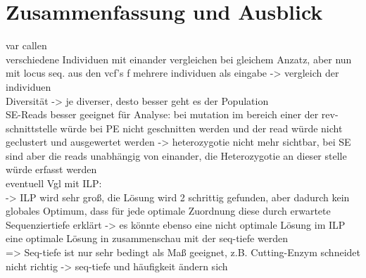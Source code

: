 \chapter{Zusammenfassung und Ausblick} \label{sec:ausblick}
var callen\\
verschiedene Individuen mit einander vergleichen bei gleichem Anzatz, aber nun mit locus seq. aus den vcf's f mehrere individuen als eingabe -> vergleich der individuen \\
Diversität -> je diverser, desto besser geht es der Population\\
SE-Reads besser geeignet für Analyse: bei mutation im bereich einer der rev-schnittstelle  würde bei PE nicht geschnitten werden und der read würde nicht geclustert und ausgewertet werden -> heterozygotie nicht mehr sichtbar, bei SE sind aber die reads unabhängig von einander, die Heterozygotie an dieser stelle würde erfasst werden\\
eventuell Vgl mit ILP:\\
-> ILP wird sehr groß, die Lösung wird 2 schrittig gefunden, aber dadurch kein globales Optimum, dass für jede optimale Zuordnung diese durch erwartete Sequenziertiefe erklärt -> es könnte ebenso eine nicht optimale Lösung im ILP eine optimale Lösung in zusammenschau mit der seq-tiefe werden \\
=> Seq-tiefe ist nur sehr bedingt als Maß geeignet, z.B. Cutting-Enzym schneidet nicht richtig -> seq-tiefe und häufigkeit ändern sich\\
\section{} \label{sec:}
\subsection{} \label{subsec:}